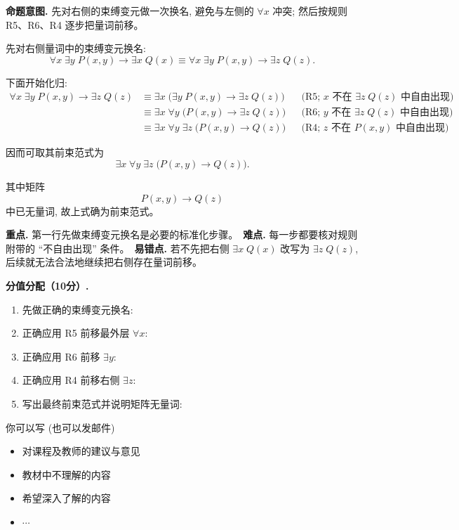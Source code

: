 \documentclass[a4paper, justified]{tufte-handout}
\newenvironment{intention}
  {\par\smallskip\noindent\textbf{命题意图. }\ignorespaces}
  {\par\smallskip}
\begin{document}
\begin{solution}
  \begin{intention}
    先对右侧的束缚变元做一次换名, 避免与左侧的 $\forall x$ 冲突; 然后按规则 R5、R6、R4 逐步把量词前移。
  \end{intention}

  先对右侧量词中的束缚变元换名:
  \[
    \forall x\; \exists y\; P(x, y) \to \exists x\; Q(x)
    \equiv
    \forall x\; \exists y\; P(x, y) \to \exists z\; Q(z).
  \]

  下面开始化归:
  \begin{align*}
    \forall x\; \exists y\; P(x, y) \to \exists z\; Q(z)
      &\equiv \exists x\; \big(\exists y\; P(x, y) \to \exists z\; Q(z)\big)
        && \text{(R5; $x$ 不在 $\exists z\; Q(z)$ 中自由出现)} \\
      &\equiv \exists x\; \forall y\; \big(P(x, y) \to \exists z\; Q(z)\big)
        && \text{(R6; $y$ 不在 $\exists z\; Q(z)$ 中自由出现)} \\
      &\equiv \exists x\; \forall y\; \exists z\; \big(P(x, y) \to Q(z)\big)
        && \text{(R4; $z$ 不在 $P(x, y)$ 中自由出现)}.
  \end{align*}

  因而可取其前束范式为
  \[
    \boxed{\exists x\; \forall y\; \exists z\; \big(P(x, y) \to Q(z)\big)}.
  \]

  其中矩阵
  \[
    P(x, y) \to Q(z)
  \]
  中已无量词, 故上式确为前束范式。

  \begin{remark}
    \textbf{重点.} 第一行先做束缚变元换名是必要的标准化步骤。\
    \textbf{难点.} 每一步都要核对规则附带的 ``不自由出现'' 条件。\
    \textbf{易错点.} 若不先把右侧 $\exists x\; Q(x)$ 改写为 $\exists z\; Q(z)$, 后续就无法合法地继续把右侧存在量词前移。
  \end{remark}

  \textbf{分值分配（10分）.}
  \begin{enumerate}[(1)]
    \item 先做正确的束缚变元换名: 
    \item 正确应用 R5 前移最外层 $\forall x$: 
    \item 正确应用 R6 前移 $\exists y$: 
    \item 正确应用 R4 前移右侧 $\exists z$: \score{2}
    \item 写出最终前束范式并说明矩阵无量词: \score{1}
  \end{enumerate}
\end{solution}


\begincorrection

\beginfb

你可以写 (也可以发邮件)
\begin{itemize}
  \item 对课程及教师的建议与意见
  \item 教材中不理解的内容
  \item 希望深入了解的内容
  \item $\cdots$
\end{itemize}
\end{document}
